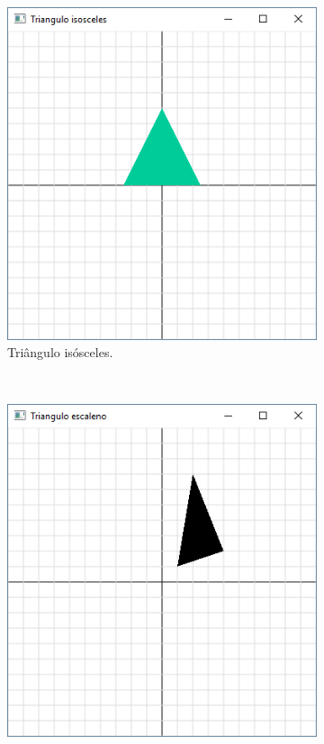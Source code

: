 \begin{renumerate}
  \begin{figure}[H]
    \centering
    \begin{subfigure}[t]{0.3\textwidth}
        \centerline{\includegraphics[width=.9\textwidth]{img/cap1_ex23}}
        \caption{Triângulo isósceles.}
        \label{fig:cap01_ex23a}
    \end{subfigure}
    ~
    \begin{subfigure}[t]{0.3\textwidth}
        \centerline{\includegraphics[width=.9\textwidth]{img/cap1_ex23b}}

\end{subfigure}
\end{figure}
\end{renumerate}
